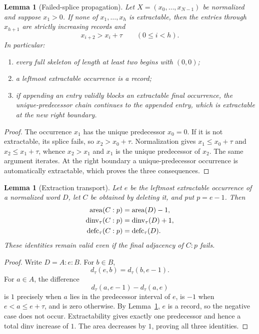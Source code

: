 \documentclass[11pt]{article}
\newtheorem{lemma}[theorem]{Lemma}
\theoremstyle{definition}
\theoremstyle{remark}
\newcommand{\area}{\operatorname{area}}
\newcommand{\dinv}{\operatorname{dinv}}
\newcommand{\defc}{\operatorname{defc}}
\begin{document}
\begin{lemma}[Failed-splice propagation]
\label{lem:propagation}
Let $X=(x_0,\ldots,x_{N-1})$ be normalized and suppose $x_1>0$.  If none
of $x_1,\ldots,x_h$ is extractable, then the entries through $x_{h+1}$ are
strictly increasing records and
\begin{equation}
  x_{i+2}>x_i+\tau
  \qquad(0\le i<h).
  \label{eq:rapid}
\end{equation}
In particular:
\begin{enumerate}
\item every full skeleton of length at least two begins with $(0,0)$;
\item a leftmost extractable occurrence is a record;
\item if appending an entry validly blocks an extractable final occurrence,
the unique-predecessor chain continues to the appended entry, which is
extractable at the new right boundary.
\end{enumerate}
\end{lemma}

\begin{proof}
The occurrence $x_1$ has the unique predecessor $x_0=0$.  If it is not
extractable, its splice fails, so $x_2>x_0+\tau$.  Normalization gives
$x_1\le x_0+\tau$ and $x_2\le x_1+\tau$, whence $x_2>x_1$ and $x_1$ is
the unique predecessor of $x_2$.  The same argument iterates.  At the right
boundary a unique-predecessor occurrence is automatically extractable, which
proves the three consequences.
\end{proof}

\begin{lemma}[Extraction transport]
\label{lem:transport}
Let $e$ be the leftmost extractable occurrence of a normalized word $D$,
let $C$ be obtained by deleting it, and put $p=e-1$.  Then
\begin{align}
 \area(C:p)&=\area(D)-1,\notag\\
 \dinv_\tau(C:p)&=\dinv_\tau(D)+1,\label{eq:transport}\\
 \defc_\tau(C:p)&=\defc_\tau(D).\notag
\end{align}
These identities remain valid even if the final adjacency of $C:p$ fails.
\end{lemma}

\begin{proof}
Write $D=A:e:B$.  For $b\in B$,
\[
  d_\tau(e,b)=d_\tau(b,e-1).
\]
For $a\in A$, the difference
\[
  d_\tau(a,e-1)-d_\tau(a,e)
\]
is $1$ precisely when $a$ lies in the predecessor interval of $e$, is
$-1$ when $e<a\le e+\tau$, and is zero otherwise.  By
Lemma~\ref{lem:propagation}, $e$ is a record, so the negative case does not
occur.  Extractability gives exactly one predecessor and hence a total dinv
increase of $1$.  The area decreases by $1$, proving all three identities.
\end{proof}
\end{document}
